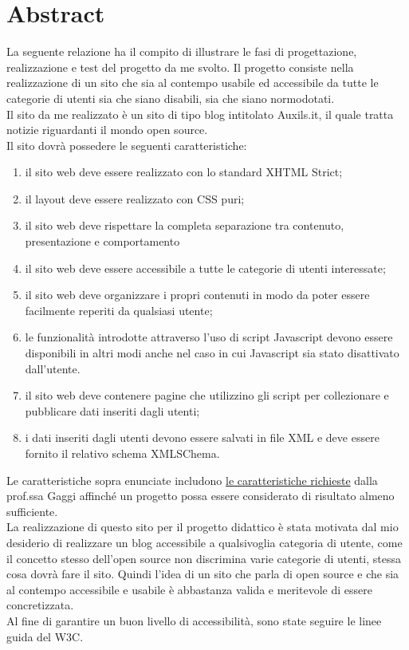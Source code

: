 \section{Abstract}
La seguente relazione ha il compito di illustrare le fasi di progettazione, realizzazione e test del progetto da me svolto.
Il progetto consiste nella realizzazione di un sito che sia al contempo usabile ed accessibile da tutte le categorie di utenti sia che siano disabili, sia che siano normodotati.\\
Il sito da me realizzato è un sito di tipo blog intitolato Auxils.it, il quale tratta notizie riguardanti il mondo open source.\\ 
Il sito dovrà possedere le seguenti caratteristiche:

\begin{enumerate}
  \item il sito web deve essere realizzato con lo standard XHTML Strict;
  \item il layout deve essere realizzato con CSS puri;
  \item il sito web deve rispettare la completa separazione tra contenuto, presentazione e comportamento
  \item il sito web deve essere accessibile a tutte le categorie di utenti interessate;
  \item il sito web deve organizzare i propri contenuti in modo da poter essere facilmente reperiti da qualsiasi utente;
  \item le funzionalità introdotte attraverso l'uso di script Javascript devono essere disponibili in altri modi anche nel caso in cui Javascript sia stato disattivato dall'utente.
  \item il sito web deve contenere pagine che utilizzino gli script per collezionare e pubblicare dati inseriti dagli utenti;
  \item i dati inseriti dagli utenti devono essere salvati in file XML e deve essere fornito il relativo schema XMLSChema.
\end{enumerate}

Le caratteristiche sopra enunciate includono \href{http://docenti.math.unipd.it/gaggi/tecweb/progetto.html}{le caratteristiche richieste} dalla prof.ssa Gaggi affinché un progetto possa essere considerato di risultato almeno sufficiente.\\
La realizzazione di questo sito per il progetto didattico è stata motivata dal mio desiderio di realizzare un blog accessibile a qualsivoglia categoria di utente, come il concetto stesso dell'open source non discrimina varie categorie di utenti, stessa cosa dovrà fare il sito. Quindi l'idea di un sito che parla di open source e che sia al contempo accessibile e usabile è abbastanza valida e meritevole di essere concretizzata. \\
Al fine di garantire un buon livello di accessibilità, sono state seguire le linee guida del W3C.